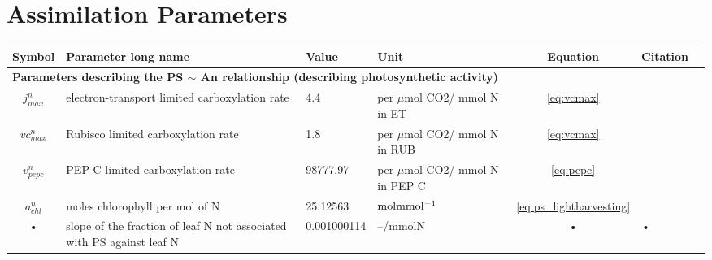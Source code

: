 \documentclass[11pt,oneside,openright,a4paper,fleqn]{book}  %
\makeatletter
\DeclareRobustCommand*\unit[1]
 {\ensuremath{%
   {\thinmuskip3mu\relax
    \def\mu{\text{\textmu}}\def~{\,}%
    \ifx\f@series\testbx\mathbf{#1}\else\mathrm{#1}\fi}}}
\makeatother
\begin{document}
\begin{table}
\section{Assimilation Parameters}\label{tab:assimi:param}

\begin{tabularx}{\linewidth}{|c|X|l|l|c|X|c|} %
\hline 
Symbol & Parameter long name & Value & Unit & Equation & Citation \\
\hline 
\multicolumn{6}{l}{\bf Parameters describing the PS $\sim$ An relationship (describing photosynthetic activity)}\\
\hline
$j_{max}^n$ & electron-transport limited carboxylation rate & 4.4 & per $\mu$mol CO2/ mmol N in ET & \ref{eq:vcmax} & \cite{Niinemets:1997ha} \\
$vc_{max}^n$ & Rubisco limited carboxylation rate & 1.8 & per $\mu$mol CO2/ mmol N in RUB & \ref{eq:vcmax}  & \cite{Niinemets:1997ha} \\
$v_{pepc}^n$ & PEP C limited carboxylation rate & 98777.97 & per $\mu$mol CO2/ mmol N in PEP C & \ref{eq:pepc} & \cite{Tazoe:2006hc} \\
$a_{chl}^n$ & moles chlorophyll per mol of N & 25.12563 & \unit{molmmol^{-1}} & \ref{eq:ps_lightharvesting} & \cite{Evans:1989bg} \\
• & slope of the fraction of leaf N not associated with PS against leaf N & 0.001000114 & --/mmolN & • & • \\

\hline 
\end{tabularx}
\end{table}
\end{document}
